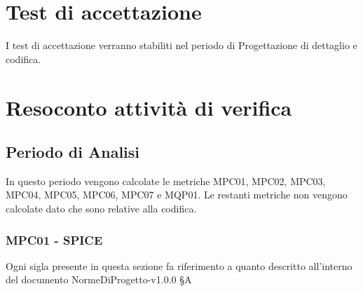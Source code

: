 \section{Test di accettazione}
I test di accettazione verranno stabiliti nel periodo di Progettazione di dettaglio e codifica.

\section{Resoconto attività di verifica}

\subsection{Periodo di Analisi}
In questo periodo vengono calcolate le metriche MPC01, MPC02, MPC03, MPC04, MPC05, MPC06, MPC07 e MQP01. Le restanti metriche non vengono calcolate dato che sono relative alla codifica.

\subsubsection{MPC01 - SPICE}
Ogni sigla presente in questa sezione fa riferimento a quanto descritto all'interno del documento NormeDiProgetto-v1.0.0 §A


